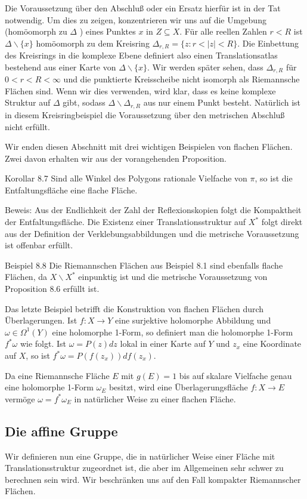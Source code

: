 \documentclass[10pt, letterpaper]{article}
\begin{document}
Die Voraussetzung über den Abschluß oder ein Ersatz hierfür ist in der Tat notwendig. Um dies zu zeigen, konzentrieren wir uns auf die Umgebung (homöomorph zu $\Delta$ ) eines Punktes $x$ in $Z \subseteq X$. Für alle reellen Zahlen $r<R$ ist $\Delta \backslash\{x\}$ homöomorph zu dem Kreisring $\Delta_{r, R}=\{z: r<|z|<R\}$. Die Einbettung des Kreisrings in die komplexe Ebene definiert also einen Translationsatlas bestehend aus einer Karte von $\Delta \backslash\{x\}$. Wir werden später sehen, dass $\Delta_{r, R}$ für $0<r<R<\infty$ und die punktierte Kreisscheibe nicht isomorph als Riemannsche Flächen sind. Wenn wir dies verwenden, wird klar, dass es keine komplexe Struktur auf $\Delta$ gibt, sodass $\Delta \backslash \Delta_{r, R}$ aus nur einem Punkt besteht. Natürlich ist in diesem Kreisringbeispiel die Voraussetzung über den metrischen Abschluß nicht erfüllt.

Wir enden diesen Abschnitt mit drei wichtigen Beispielen von flachen Flächen. Zwei davon erhalten wir aus der vorangehenden Proposition.

Korollar 8.7 Sind alle Winkel des Polygons rationale Vielfache von $\pi$, so ist die Entfaltungsfläche eine flache Fläche.

Beweis: Aus der Endlichkeit der Zahl der Reflexionskopien folgt die Kompaktheit der Entfaltungsfläche. Die Existenz einer Translationsstruktur auf $X^{*}$ folgt direkt aus der Definition der Verklebungsabbildungen und die metrische Voraussetzung ist offenbar erfüllt.

Beispiel 8.8 Die Riemannschen Flächen aus Beispiel 8.1 sind ebenfalls flache Flächen, da $X \backslash X^{*}$ einpunktig ist und die metrische Voraussetzung von Proposition 8.6 erfüllt ist.

Das letzte Beispiel betrifft die Konstruktion von flachen Flächen durch Überlagerungen. Ist $f: X \longrightarrow Y$ eine surjektive holomorphe Abbildung und $\omega \in \Omega^{1}(Y)$ eine holomorphe 1-Form, so definiert man die holomorphe 1-Form $f^{*} \omega$ wie folgt. Ist $\omega=P(z) d z$ lokal in einer Karte auf $Y$ und $z_{x}$ eine Koordinate auf $X$, so ist $f^{*} \omega=P\left(f\left(z_{x}\right)\right) d f\left(z_{x}\right)$.

Da eine Riemannsche Fläche $E$ mit $g(E)=1$ bis auf skalare Vielfache genau eine holomorphe 1-Form $\omega_{E}$ besitzt, wird eine Überlagerungsfläche $f: X \longrightarrow E$ vermöge $\omega=f^{*} \omega_{E}$ in natürlicher Weise zu einer flachen Fläche.

\subsection {Die affine Gruppe}
Wir definieren nun eine Gruppe, die in natürlicher Weise einer Fläche mit Translationsstruktur zugeordnet ist, die aber im Allgemeinen sehr schwer zu berechnen sein wird. Wir beschränken uns auf den Fall kompakter Riemannscher Flächen.
\end{document}
